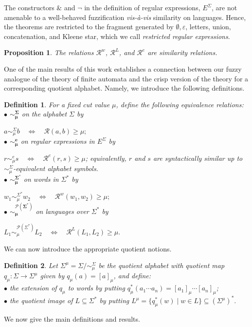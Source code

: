 \documentclass{easychair}
\newtheorem{definition}{Definition}
\newtheorem{proposition}{Proposition}
\begin{document}
The constructors $\&$ and $\neg$ in the definition of regular expressions, $E^\Sigma$, are not amenable to a well-behaved fuzzification {\em vis-à-vis} similarity on languages. Hence, the theorems are restricted to the fragment generated by $\emptyset,\varepsilon$,
letters, union, concatenation, and Kleene star, which we call {\em restricted regular expressions}.

\begin{proposition} The relations $\mathcal R^w$, $\mathcal R^L$, and $\mathcal R^e$ are similarity relations.
\end{proposition}

One of the main results of this work establishes a connection between our fuzzy analogue of the theory of finite automata and the crisp version of the theory for a corresponding quotient alphabet. Namely, we introduce the following definitions.
\begin{definition}For a fixed cut value $\mu$, define the following equivalence relations: \\
$\bullet$ $\boldsymbol{\sim_\mu^\Sigma}$ on the alphabet $\Sigma$ by

$a\sim_\mu^\Sigma b
\quad\Longleftrightarrow\quad
\mathcal R(a,b)\ge\mu;
$
\\
$\bullet$ $\boldsymbol{\sim_\mu^e}$ on regular expressions in $E^\Sigma$ by

$r\sim_\mu^e s
\quad\Longleftrightarrow\quad
\mathcal R^e(r,s)\ge\mu$;
equivalently, $r$ and $s$ are syntactically similar up to $\sim_\mu^\Sigma$-equivalent alphabet symbols.
\\
$\bullet$ $\boldsymbol{\sim_\mu^{\Sigma^\ast}}$ on words in $\Sigma^\ast$ by
 
$w_1\sim_\mu^{\Sigma^\ast} w_2
\quad\Longleftrightarrow\quad
\mathcal R^w(w_1,w_2)\ge\mu;
$\\
$\bullet$ $\boldsymbol{\sim_\mu^{\mathcal P(\Sigma^\ast)}}$ on languages over $\Sigma^\ast$ by

$L_1\sim_\mu^{\mathcal P(\Sigma^\ast)} L_2
\quad\Longleftrightarrow\quad
\mathcal R^L(L_1,L_2)\ge\mu.
$
\end{definition}
We can now introduce the appropriate quotient notions.
\begin{definition}Let
$\Sigma^\mu=\Sigma/{\sim_\mu^\Sigma}$
be the {\em quotient alphabet} with quotient map
$q_\mu:\Sigma\to\Sigma^\mu$ given by $q_\mu(a)=[a]_\mu$, and define:\\
$\bullet$ the extension of $q_\mu$ to words by putting $
q_\mu^\ast(a_1\cdots a_n)
=
[a_1]_\mu\cdots[a_n]_\mu
$; \\
$\bullet$ the quotient image of $L\subseteq\Sigma^\ast$ by putting
$ L^\mu=
\{q_\mu^\ast(w)\mid w\in L\}
\subseteq(\Sigma^\mu)^\ast.
$
\end{definition}
We now give the main definitions and results.
\end{document}
